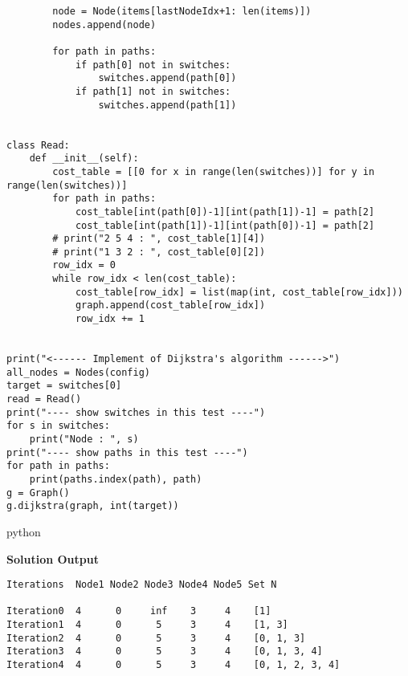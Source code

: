 \documentclass[12pt]{article}
\begin{document}
\begin{verbatim}
        node = Node(items[lastNodeIdx+1: len(items)])
        nodes.append(node)
       
        for path in paths:
            if path[0] not in switches:
                switches.append(path[0])
            if path[1] not in switches:
                switches.append(path[1])


class Read:
    def __init__(self):
        cost_table = [[0 for x in range(len(switches))] for y in range(len(switches))] 
        for path in paths:
            cost_table[int(path[0])-1][int(path[1])-1] = path[2]
            cost_table[int(path[1])-1][int(path[0])-1] = path[2]
        # print("2 5 4 : ", cost_table[1][4])
        # print("1 3 2 : ", cost_table[0][2])
        row_idx = 0
        while row_idx < len(cost_table):
            cost_table[row_idx] = list(map(int, cost_table[row_idx]))
            graph.append(cost_table[row_idx])
            row_idx += 1
       

print("<------ Implement of Dijkstra's algorithm ------>")
all_nodes = Nodes(config)
target = switches[0]
read = Read()
print("---- show switches in this test ----")
for s in switches:
    print("Node : ", s)
print("---- show paths in this test ----")
for path in paths:
    print(paths.index(path), path)
g = Graph()
g.dijkstra(graph, int(target))

\end{verbatim}{python}



\noindent\textbf{Solution Output}

\begin{lstlisting}
Iterations	Node1 Node2	Node3 Node4	Node5 Set N

Iteration0	4	   0	 inf	3     4	   [1]
Iteration1	4	   0	  5	    3	  4    [1, 3]
Iteration2	4	   0	  5	    3 	  4	   [0, 1, 3]
Iteration3	4	   0	  5	    3     4	   [0, 1, 3, 4]
Iteration4	4	   0      5	    3	  4	   [0, 1, 2, 3, 4]
\end{lstlisting}
\end{document}
